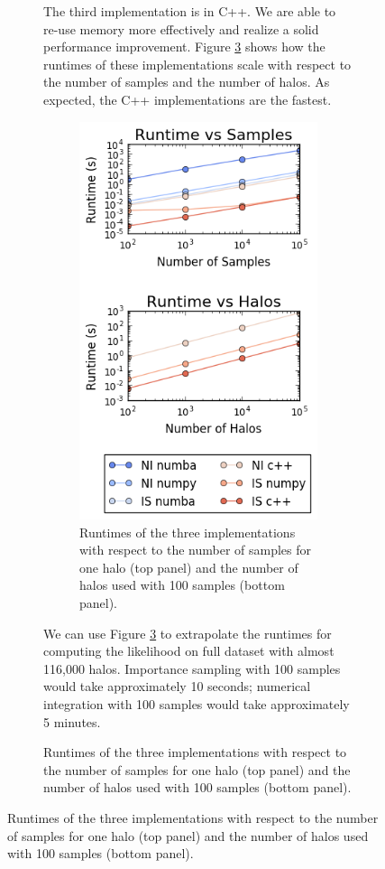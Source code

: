 \documentclass[\docopts]{\docclass}
\begin{document}
\begin{figure}[h!]
\begin{figure}[h!]
The third implementation is in C++. We are able to re-use memory more effectively and realize a solid performance improvement. Figure \ref{fig:multi_convergence} shows how the runtimes of these implementations scale with respect to the number of samples and the number of halos. As expected, the C++ implementations are the fastest.

\begin{figure}[!h]
\centering
\includegraphics[width=0.9\columnwidth]{multi_convergence.png}
\caption{
Runtimes of the three implementations with respect to the number of samples for one halo (top panel) and the number of halos used with 100 samples (bottom panel).
\label{fig:multi_convergence}}
\end{figure}

We can use Figure \ref{fig:multi_convergence} to extrapolate the runtimes for computing the likelihood on full dataset with almost 116,000 halos. Importance sampling with 100 samples would take approximately 10 seconds;  numerical integration with 100 samples would take approximately 5 minutes.


\end{figure}
\end{figure}
\end{document}
